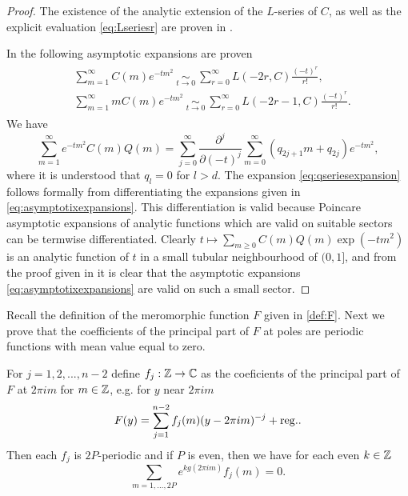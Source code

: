 	\begin{proof} 
		The existence of the analytic extension of the $L$-series of $C$, as well as the explicit evaluation \eqref{eq:Lseriesr} are proven in \cite{LawrenceZagier}.
		
		 In \cite{hikami2003qseries,LawrenceZagier} the following asymptotic expansions are proven\begin{align} \begin{split} \label{eq:asymptotixexpansions} 
		 &	\sum_{m=1}^{\infty} C(m) e^{-tm^2} \ \underset{t \rightarrow 0}{\sim} \  \sum_{r=0}^{\infty} L(-2r,C) \frac{(-t)^r}{r!},\\   &\sum_{m=1}^{\infty} m C(m) e^{-tm^2} \ \underset{t \rightarrow 0}{\sim} \  \sum_{r=0}^{\infty} L(-2r-1,C) \frac{(-t)^r}{r!}. \end{split} 	\end{align}	We have	\begin{equation} \label{eq:difff}	\sum_{m=1}^{\infty} e^{-tm^2}C(m)Q(m)= \sum_{j=0}^{\infty} \frac{\partial^j}{\partial (-t)^j} \sum_{m=0}^{\infty} (q_{2j+1}m+q_{2j})e^{-tm^2},	\end{equation}
		 where it is understood that $q_l=0$ for $l>d$.	The expansion \eqref{eq:qseriesexpansion} follows formally from differentiating the expansions given in \eqref{eq:asymptotixexpansions}. This differentiation is valid because Poincare asymptotic expansions of analytic functions which are valid on suitable sectors can be termwise differentiated. Clearly $t \mapsto \sum_{m\geq 0} C(m)Q(m)\exp(-tm^2)$ is an analytic function of $t$ in a small tubular neighbourhood of $(0,1]$, and from the proof given in \cite{LawrenceZagier} it is clear that the asymptotic expansions \eqref{eq:asymptotixexpansions} are valid on such a small sector. 
	\end{proof} 



Recall the definition of the meromorphic function $F$ given in  \eqref{def:F}. Next we prove that the coefficients of the principal part of $F$ at poles are periodic functions with mean value equal to zero.
\begin{proposition} \label{pro:Fmeanvaluezero}
	For $j=1,2,...,n-2$ define $f_j: \mathbb{Z}\rightarrow \mathbb{C}$ as the coeficients of the principal part of $F$ at $2\pi i m$ for $m \in \mathbb{Z}$, e.g. for $y$ near $2\pi im$
	\begin{equation}
	F(y) = \sum_{j=1}^{n-2} f_j(m) (y-2\pi i m) ^{-j}+\rm{reg.}.
	\end{equation}
	Then each $f_j$ is $2P$-periodic and if $P$ is even, then we have for each even $k \in \mathbb{Z}$ 
	\begin{equation} \label{eq:MeanValueZero}
	\sum_{m =1,...,2P } e^{kg(2\pi im)} f_j(m)=0.
	\end{equation}
	\end{proposition}

